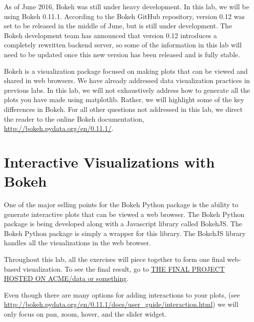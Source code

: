 \label{lab:Bokeh}


\begin{warn}
As of June 2016, Bokeh was still under heavy development. In this lab, we will
be using Bokeh 0.11.1. According to the Bokeh GitHub repository, version 0.12
was set to be released in the middle of June, but is still under development.
The Bokeh development team has announced that version 0.12 introduces a
completely rewritten backend server, so some of the information in this lab will
need to be updated once this new version has been released and is fully stable.
\end{warn}

Bokeh is a visualization package focused on making plots that can be viewed and
shared in web browsers. We have already addressed data visualization practices
in previous labs. In this lab, we will not exhaustively address how to generate
all the plots you have made using matplotlib. Rather, we will highlight some of
the key differences in Bokeh. For all other questions not addressed in this lab,
we direct the reader to the online Bokeh documentation,
\url{http://bokeh.pydata.org/en/0.11.1/}.

\section*{Interactive Visualizations with Bokeh}

One of the major selling points for the Bokeh Python package is the ability to
generate interactive plots that can be viewed a web browser.
The Bokeh Python package is being developed along with a Javascript library
called BokehJS. The Bokeh Python package is simply a wrapper for this library.
The BokehJS library handles all the visualizations in the web browser.

Throughout this lab, all the exercises will piece together to form one final
web-based visualization. To see the final result, go to
\url{THE FINAL PROJECT HOSTED ON ACME/data or something}.

Even though there are many options for adding interactions to your plots,
(see \url{http://bokeh.pydata.org/en/0.11.1/docs/user_guide/interaction.html})
we will only focus on pan, zoom, hover, and the slider widget.

